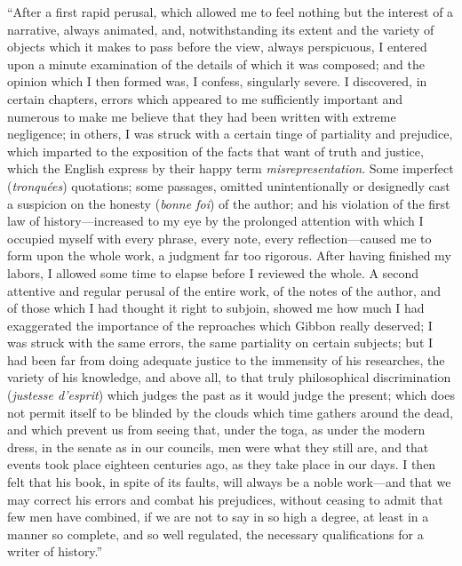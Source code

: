 “After a first rapid perusal, which allowed me to feel nothing but the interest
of a narrative, always animated, and, notwithstanding its extent and the variety
of objects which it makes to pass before the view, always perspicuous, I entered
upon a minute examination of the details of which it was composed; and the
opinion which I then formed was, I confess, singularly severe. I discovered,
in certain chapters, errors which appeared to me sufficiently important and
numerous to make me believe that they had been written with extreme negligence;
in others, I was struck with a certain tinge of partiality and prejudice, which
imparted to the exposition of the facts that want of truth and justice, which
the English express by their happy term \textit{misrepresentation}. Some
imperfect (\textit{tronquées}) quotations; some passages, omitted unintentionally
or designedly cast a suspicion on the honesty (\textit{bonne foi}) of the author;
and his violation of the first law of history—increased to my eye by the prolonged
attention with which I occupied myself with every phrase, every note, every
reflection—caused me to form upon the whole work, a judgment far too rigorous.
After having finished my labors, I allowed some time to elapse before I reviewed
the whole. A second attentive and regular perusal of the entire work, of the
notes of the author, and of those which I had thought it right to subjoin,
showed me how much I had exaggerated the importance of the reproaches which
Gibbon really deserved; I was struck with the same errors, the same partiality
on certain subjects; but I had been far from doing adequate justice to the
immensity of his researches, the variety of his knowledge, and above all, to
that truly philosophical discrimination (\textit{justesse d’esprit}) which
judges the past as it would judge the present; which does not permit itself
to be blinded by the clouds which time gathers around the dead, and which
prevent us from seeing that, under the toga, as under the modern dress, in
the senate as in our councils, men were what they still are, and that events
took place eighteen centuries ago, as they take place in our days. I then felt
that his book, in spite of its faults, will always be a noble work—and that
we may correct his errors and combat his prejudices, without ceasing to admit
that few men have combined, if we are not to say in so high a degree, at least
in a manner so complete, and so well regulated, the necessary qualifications
for a writer of history.”


